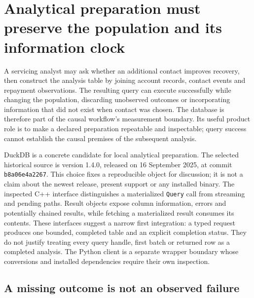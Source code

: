\section{Analytical preparation must preserve the population and its information clock}
\label{exec19:duckdb-preparation}

A servicing analyst may ask whether an additional contact improves recovery,
then construct the analysis table by joining account records, contact events
and repayment observations. The resulting query can execute successfully while
changing the population, discarding unobserved outcomes or incorporating
information that did not exist when contact was chosen. The database is
therefore part of the causal workflow's measurement boundary. Its useful
product role is to make a declared preparation repeatable and inspectable;
query success cannot establish the causal premises of the subsequent analysis.

DuckDB is a concrete candidate for local analytical preparation. The selected
historical source is version 1.4.0, released on 16 September 2025, at commit
\texttt{b8a06e4a2267}. This choice fixes a reproducible object for discussion;
it is not a claim about the newest release, present support or any installed
binary. The inspected C++ interface distinguishes a materialized
\texttt{Query} call from streaming and pending paths. Result objects expose
column information, errors and potentially chained results, while fetching a
materialized result consumes its contents. These interfaces suggest a narrow
first integration: a typed request produces one bounded, completed table and
an explicit completion status. They do not justify treating every query handle,
first batch or returned row as a completed analysis. The Python client is a
separate wrapper boundary whose conversions and installed dependencies require
their own inspection.\citep{exec19_duckdb_source}

\subsection{A missing outcome is not an observed failure}
\label{exec19:duckdb-missingness}

